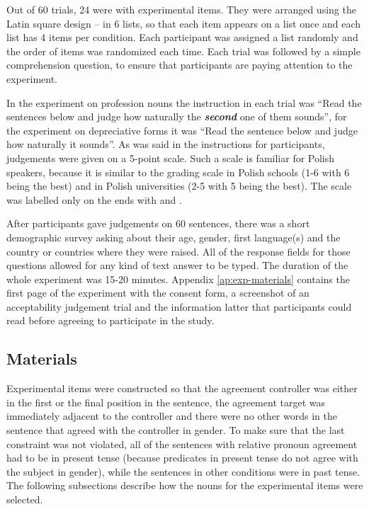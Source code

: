 Out of 60 trials, 24 were with experimental items. They were arranged using the Latin square design -- in 6 lists, so that each item appears on a list once and each list has 4 items per condition. Each participant was assigned a list randomly and the order of items was randomized each time. Each trial was followed by a simple comprehension question, to ensure that participants are paying attention to the experiment.

In the experiment on profession nouns the instruction in each trial was ``Read the sentences below and judge how naturally the \textbf{\textsl{second}} one of them sounds'', for the experiment on depreciative forms it was ``Read the sentence below and judge how naturally it sounds''. As was said in the instructions for participants, judgements were given on a 5-point scale. Such a scale is familiar for Polish speakers, because it is similar to the grading scale in Polish schools (1-6 with 6 being the best) and in Polish universities (2-5 with 5 being the best). The scale was labelled only on the ends with  and .

After participants gave judgements on 60 sentences, there was a short demographic survey asking about their age, gender, first language(s) and the country or countries where they were raised. All of the response fields for those questions allowed for any kind of text answer to be typed. The duration of the whole experiment was 15-20 minutes. Appendix \ref{ap:exp-materials} contains the first page of the experiment with the consent form, a screenshot of an acceptability judgement trial and the information latter that participants could read before agreeing to participate in the study.

\subsection{Materials}
Experimental items were constructed so that the agreement controller was either in the first or the final position in the sentence, the agreement target was immediately adjacent to the controller and there were no other words in the sentence that agreed with the controller in gender. To make sure that the last constraint was not violated, all of the sentences with relative pronoun agreement had to be in present tense (because predicates in present tense do not agree with the subject in gender), while the sentences in other conditions were in past tense. The following subsections describe how the nouns for the experimental items were selected.

